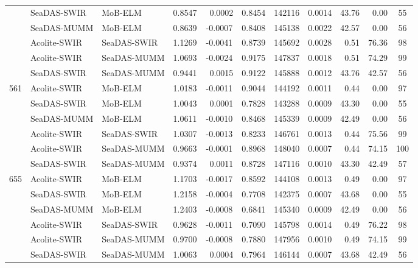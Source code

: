 \documentclass[draft]{spie}  %
\begin{document}
\begin{table}[!ht]
\begin{tabular}{cllcccccccc}
			&   SeaDAS-SWIR   &  MoB-ELM      &	0.8547 	&	~0.0002 &	0.8454 	&	142116  &	0.0014  &  43.76    	& ~0.00      		   &   55   	 \\
			&   SeaDAS-MUMM   &  MoB-ELM      &	0.8639 	&	-0.0007 &	0.8408 	&	145138  &	0.0022  &  42.57    	& ~0.00      		   &   56   	 \\ 
			&   Acolite-SWIR  &  SeaDAS-SWIR  &	1.1269 	&	-0.0041 &	0.8739 	&	145692  &	0.0028  &  ~0.51     	& 76.36     		   &   98   	 \\
			&   Acolite-SWIR  &  SeaDAS-MUMM  &	1.0693 	&	-0.0024 &	0.9175 	&	147837  &	0.0018  &  ~0.51     	& 74.29     		   &   99   	 \\
			&   SeaDAS-SWIR   &  SeaDAS-MUMM  &	0.9441 	&	~0.0015 &	0.9122 	&	145888  &	0.0012  &  43.76    	& 42.57     		   &   56   	 \\ \hline
\multirow{6}{*}{561}&Acolite-SWIR&  MoB-ELM   &	1.0183 	&	-0.0011 &	0.9044 	&	144192  &	0.0011  &  ~0.44     	& ~0.00      		   &   97   	 \\
	 		&   SeaDAS-SWIR   &  MoB-ELM      &	1.0043 	&	~0.0001 &	0.7828 	&	143288  &	0.0009  &  43.30    	& ~0.00      		   &   55   	 \\
	 		&   SeaDAS-MUMM   &  MoB-ELM      &	1.0611 	&	-0.0010 &	0.8468 	&	145339  &	0.0009  &  42.49    	& ~0.00      		   &   56   	 \\
	 		&   Acolite-SWIR  &  SeaDAS-SWIR  &	1.0307 	&	-0.0013 &	0.8233 	&	146761  &	0.0013  &  ~0.44     	& 75.56     		   &   99   	 \\
	 		&   Acolite-SWIR  &  SeaDAS-MUMM  &	0.9663 	&	-0.0001 &	0.8968 	&	148040  &	0.0007  &  ~0.44     	& 74.15     		   &   100  	 \\
	  		&   SeaDAS-SWIR   &  SeaDAS-MUMM  &	0.9374 	&	~0.0011 &	0.8728 	&	147116  &	0.0010  &  43.30    	& 42.49     		   &   57   	 \\ \hline
\multirow{6}{*}{655}&Acolite-SWIR&MoB-ELM     &	1.1703 	&	-0.0017 &	0.8592 	&	144108  &	0.0013  &  ~0.49     	& ~0.00      		   &   97   	 \\
	 		&   SeaDAS-SWIR   &  MoB-ELM      &	1.2158 	&	-0.0004 &	0.7708 	&	142375  &	0.0007  &  43.68    	& ~0.00      		   &   55   	 \\
	 		&   SeaDAS-MUMM   &  MoB-ELM      &	1.2403 	&	-0.0008 &	0.6841 	&	145340  &	0.0009  &  42.49    	& ~0.00      		   &   56   	 \\ 
	 		&   Acolite-SWIR  &  SeaDAS-SWIR  &	0.9628 	&	-0.0011 &	0.7090 	&	145798  &	0.0014  &  ~0.49     	& 76.22     		   &   98   	 \\
	 		&   Acolite-SWIR  &  SeaDAS-MUMM  &	0.9700 	&	-0.0008 &	0.7880 	&	147956  &	0.0010  &  ~0.49     	& 74.15     		   &   99   	 \\
	 		&   SeaDAS-SWIR   &  SeaDAS-MUMM  &	1.0063 	&	~0.0004 &	0.7964 	&	146144  &	0.0007  &  43.68    	& 42.49     		   &   56   	 \\
 \end{tabular}
\end{table}
\end{document}
